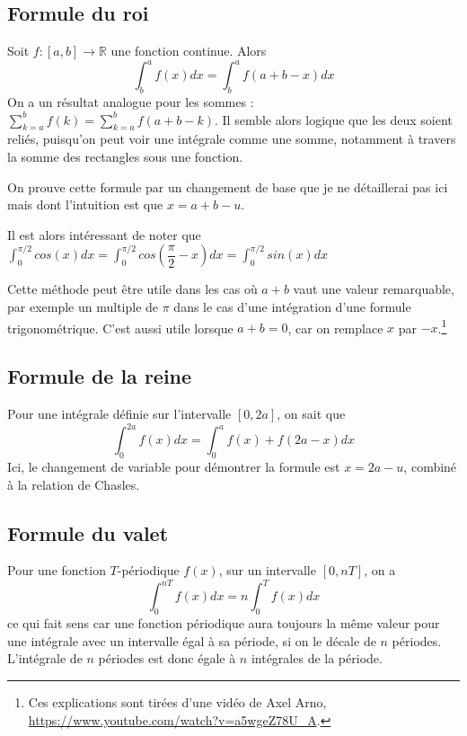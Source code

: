 \documentclass[10pt,a4paper]{book}
\newcommand{\R}{\mathbb{R}}
\begin{document}
\subsection{Formule du roi}
Soit $f:[a,b]\to\R$ une fonction continue. Alors 
\[\int^a_b f(x) dx = \int^a_b f(a+b-x) dx\]
On a un résultat analogue pour les sommes : $\sum^b_{k=a} f(k) = \sum^b_{k=a} f(a+b-k)$. Il semble alors logique que les deux soient reliés, puisqu'on peut voir une intégrale comme une somme, notamment à travers la somme des rectangles sous une fonction.\par 
On prouve cette formule par un changement de base que je ne détaillerai pas ici mais dont l'intuition est que $x=a+b-u$.\par 
Il est alors intéressant de noter que $\int^{\pi/2}_0 cos(x)dx = \int^{\pi/2}_0 cos(\dfrac{\pi}{2}-x)dx = \int^{\pi/2}_0 sin(x)dx$\par 
Cette méthode peut être utile dans les cas où $a+b$ vaut une valeur remarquable, par exemple un multiple de $\pi$ dans le cas d'une intégration d'une formule trigonométrique. C'est aussi utile lorsque $a+b=0$, car on remplace $x$ par $-x$.\footnote{Ces explications sont tirées d'une vidéo de Axel Arno, \url{https://www.youtube.com/watch?v=a5wgeZ78U_A}.}

\subsection{Formule de la reine}
Pour une intégrale définie sur l'intervalle $[0,2a]$, on sait que 
\[\int^{2a}_0 f(x)dx = \int^{a}_0 f(x)+f(2a-x)dx \]
Ici, le changement de variable pour démontrer la formule est $x=2a-u$, combiné à la relation de Chasles.

\subsection{Formule du valet}
Pour une fonction $T$-périodique $f(x)$, sur un intervalle $[0,nT]$, on a
\[\int^{nT}_0 f(x)dx = n\int^T_0 f(x)dx\]
ce qui fait sens car une fonction périodique aura toujours la même valeur pour une intégrale avec un intervalle égal à sa période, si on le décale de $n$ périodes. L'intégrale de $n$ périodes est donc égale à $n$ intégrales de la période.
\end{document}

